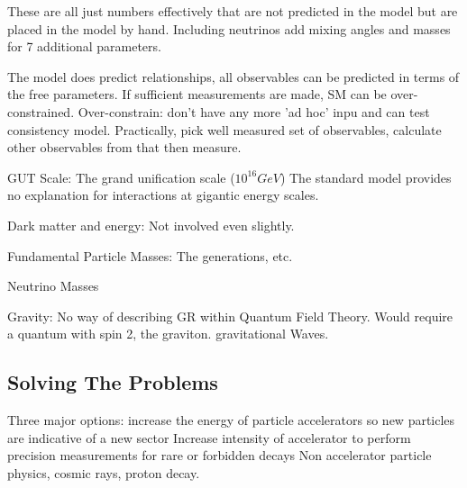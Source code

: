 \documentclass[]{article}
\begin{document}
These are all just numbers effectively that are not predicted in the model but are placed in the model by hand. Including neutrinos add mixing angles and masses for 7 additional parameters.

The model does predict relationships, all observables can be predicted in terms of the free parameters. If sufficient measurements are made, SM can be over-constrained. Over-constrain: don't have any more 'ad hoc' inpu and can test consistency model. Practically, pick well measured set of observables, calculate other observables from that then measure.

GUT Scale:
The grand unification scale ($10^{16}GeV$) The standard model provides no explanation for interactions at gigantic energy scales.

Dark matter and energy:
Not involved even slightly. 

Fundamental Particle Masses:
The generations, etc.

Neutrino Masses

Gravity:
No way of describing GR within Quantum Field Theory. Would require a quantum with spin 2, the graviton. gravitational Waves.

\subsection{Solving The Problems}

Three major options: increase the energy of particle accelerators so new particles are indicative of a new sector
Increase intensity of accelerator to perform precision measurements for rare or forbidden decays
Non accelerator particle physics, cosmic rays, proton decay.
\end{document}
